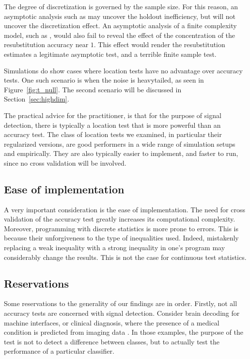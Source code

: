 \documentclass[12pt,a4paper]{article}
\begin{document}
The degree of discretization is governed by the sample size. 
For this reason, an asymptotic analysis such as \cite{ramdas_classification_2016} may uncover the holdout inefficiency, but will not uncover the discretization effect. 
An asymptotic analysis of a finite complexity model, such as \cite[Sec~4.3]{golland_permutation_2005}, would also fail to reveal the effect of the concentration of the resubstitution accuracy near $1$. This effect would render the resubstitution estimates a legitimate asymptotic test, and a terrible finite sample test. 

Simulations do show cases where location tests have no advantage over accuracy tests. 
One such scenario is when the noise is heavytailed, as seen in Figure~\ref{fig:t_null}.
The second scenario will be discussed in Section~\ref{sec:highdim}.

The practical advice for the practitioner, is that for the purpose of signal detection, there is typically a location test that is more powerful than an accuracy test. 
The class of location tests we examined, in particular their regularized versions, are good performers in a wide range of simulation setups and empirically. 
They are also typically easier to implement, and faster to run, since no cross validation will be involved. 



\subsection{Ease of implementation}
A very important consideration is the ease of implementation. 
The need for cross validation of the accuracy test greatly increases its computational complexity. 
Moreover, programming with discrete statistics is more prone to errors. 
This is because their unforgiveness to the type of inequalities used. 
Indeed, mistakenly replacing a weak inequality with a strong inequality in one's program may considerably change the results. 
This is not the case for continuous test statistics. 




\subsection{Reservations}
\label{sec:reservations}

Some reservations to the generality of our findings are in order. 
Firstly, not all accuracy tests are concerned with signal detection.
Consider brain decoding for machine interfaces, or clinical diagnosis, where the presence of a medical condition is predicted from imaging data \citep[e.g.][]{olivetti_induction_2012,wager_fmri-based_2013}. 
In those examples, the purpose of the test is not to detect a difference between classes, but to actually test the performance of a particular classifier.  
\end{document}
